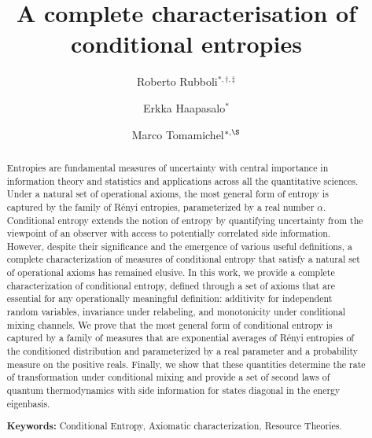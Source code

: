 \documentclass[aps,pra,11pt,onecolumn,nofootinbib,tightenlines]{revtex4-2}
\theoremstyle{definition}
\newcommand{\RR}[1]{\textcolor{red}{(RR: #1)}}
\begin{document}
\title{\Large A complete characterisation of conditional entropies}

\begin{abstract}
Entropies are fundamental measures of uncertainty with central importance in information theory and statistics and applications across all the quantitative sciences. Under a natural set of operational axioms, the most general form of entropy is captured by the family of Rényi entropies, parameterized by a real number $\alpha$. 
%
Conditional entropy extends the notion of entropy by quantifying uncertainty from the viewpoint of an observer with access to potentially correlated side information. However, despite their significance and the emergence of various useful definitions, a complete characterization of measures of conditional entropy that satisfy a natural set of operational axioms has remained elusive.
%
In this work, we provide a complete characterization of conditional entropy, defined through a set of axioms that are essential for any operationally meaningful definition: additivity for independent random variables, invariance under relabeling, and monotonicity under conditional mixing channels. 
%
We prove that the most general form of conditional entropy is captured by a family of measures that are exponential averages of Rényi entropies of the conditioned distribution and parameterized by a real parameter and a probability measure on the positive reals. Finally, we show that these quantities determine the rate of transformation under conditional mixing and provide a set of second laws of quantum thermodynamics with side information for states diagonal in the energy eigenbasis.



\bigskip

\noindent\textbf{Keywords:} Conditional Entropy, Axiomatic characterization, Resource Theories.

\end{abstract}

\medskip




\author{Roberto Rubboli$^{*,\dagger,\ddagger}$}
\author{Erkka Haapasalo$^{*}$}
\author{Marco Tomamichel$^{*,\S}$}
\end{document}
